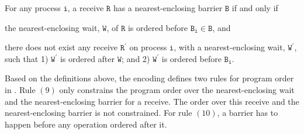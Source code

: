 \begin{definition}\label{def:nb}
For any process $\mathtt{i}$, a receive $\mathtt{R}$ has a nearest-enclosing barrier $\mathtt{B}$ if and only if
\begin{compactenum}
\item the nearest-enclosing wait, $\mathtt{W}$, of $\mathtt{R}$ is ordered before $\mathtt{B_i}\in \mathtt{B}$, and
\item there does not exist any receive $\mathtt{R^\prime}$ on process $\mathtt{i}$, with a nearest-enclosing wait, $\mathtt{W^\prime}$, such that 1) $\mathtt{W^\prime}$ is ordered after $\mathtt{W}$; and 2) $\mathtt{W^\prime}$ is ordered before $\mathtt{B_i}$.
\end{compactenum}
\end{definition}

Based on the definitions above, the encoding defines two rules for program order in . Rule $(9)$ only constrains the program order over the nearest-enclosing wait and the nearest-enclosing barrier for a receive. The order over this receive and the nearest-enclosing barrier is not constrained. For rule $(10)$, a barrier has to happen before any operation ordered after it. 



\encodingcc


